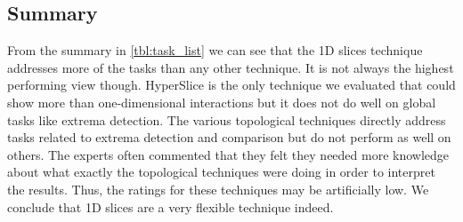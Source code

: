 \subsection{Summary}

From the summary in \autoref{tbl:task_list} we can see that the 1D slices
technique addresses more of the tasks than any other technique.  It is not
always the highest performing view though.  HyperSlice is the only technique we
evaluated that could show more than one-dimensional interactions but it does
not do well on global tasks like extrema detection. The various topological
techniques directly address tasks related to extrema detection and comparison
but do not perform as well on others. 
The experts often commented that they felt they needed more knowledge about
what exactly the topological techniques were doing in order to interpret
the results. Thus, the ratings for these techniques may be artificially low.
We conclude that 1D slices are a
very flexible technique indeed.  

